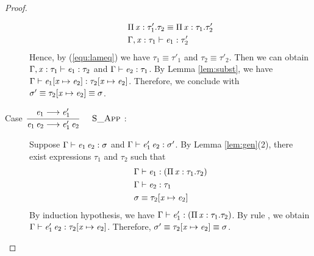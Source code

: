 \begin{proof}
\begin{description}
        \begin{align}
            &\Pi \, \mathit{x}  :  \tau'_{{\mathrm{1}}}  .  \tau_{{\mathrm{2}}}  \equiv  \Pi \, \mathit{x}  :  \tau_{{\mathrm{1}}}  .  \tau'_{{\mathrm{2}}} \label{equ:lameq}\\
            &\Gamma  ,  \mathit{x}  :  \tau_{{\mathrm{1}}}  \vdash  \mathit{e_{{\mathrm{1}}}}  :  \tau'_{{\mathrm{2}}} \nonumber
        \end{align}
        Hence, by (\ref{equ:lameq}) we have $\tau_{{\mathrm{1}}}  \equiv  \tau'_{{\mathrm{1}}}$ and $\tau_{{\mathrm{2}}}  \equiv  \tau'_{{\mathrm{2}}}$. Then we can obtain $\Gamma  ,  \mathit{x}  :  \tau_{{\mathrm{1}}}  \vdash  \mathit{e_{{\mathrm{1}}}}  :  \tau_{{\mathrm{2}}}$ and $\Gamma  \vdash  \mathit{e_{{\mathrm{2}}}}  :  \tau_{{\mathrm{1}}}$. By Lemma \ref{lem:subst}, we have $\Gamma  \vdash  \mathit{e_{{\mathrm{1}}}}  [  \mathit{x}  \mapsto  \mathit{e_{{\mathrm{2}}}}  ]  :  \tau_{{\mathrm{2}}}  [  \mathit{x}  \mapsto  \mathit{e_{{\mathrm{2}}}}  ]$. Therefore, we conclude with $\sigma'  \equiv  \tau_{{\mathrm{2}}}  [  \mathit{x}  \mapsto  \mathit{e_{{\mathrm{2}}}}  ]  \equiv  \sigma$.
        
        \item[Case ${\displaystyle\frac{\begin{array}{l} {\mathit{e_{{\mathrm{1}}}} \longrightarrow \mathit{e'_{{\mathrm{1}}}}} \end{array}}{ \mathit{e_{{\mathrm{1}}}} \, \mathit{e_{{\mathrm{2}}}} \longrightarrow \mathit{e'_{{\mathrm{1}}}} \, \mathit{e_{{\mathrm{2}}}}}\quad\textsc{ {\textsc{S\_App}}{} }}$:] $\quad$ \\
        Suppose $\Gamma  \vdash  \mathit{e_{{\mathrm{1}}}} \, \mathit{e_{{\mathrm{2}}}}  :  \sigma$ and $\Gamma  \vdash  \mathit{e'_{{\mathrm{1}}}} \, \mathit{e_{{\mathrm{2}}}}  :  \sigma'$. By Lemma \ref{lem:gen}(2), there exist expressions $\tau_{{\mathrm{1}}}$ and $\tau_{{\mathrm{2}}}$ such that 
        \begin{align*}
            &\Gamma  \vdash  \mathit{e_{{\mathrm{1}}}}  :  (  \Pi \, \mathit{x}  :  \tau_{{\mathrm{1}}}  .  \tau_{{\mathrm{2}}}  ) \\
            &\Gamma  \vdash  \mathit{e_{{\mathrm{2}}}}  :  \tau_{{\mathrm{1}}}\\
            &\sigma  \equiv  \tau_{{\mathrm{2}}}  [  \mathit{x}  \mapsto  \mathit{e_{{\mathrm{2}}}}  ]
        \end{align*}
        By induction hypothesis, we have $\Gamma  \vdash  \mathit{e'_{{\mathrm{1}}}}  :  (  \Pi \, \mathit{x}  :  \tau_{{\mathrm{1}}}  .  \tau_{{\mathrm{2}}}  )$. By rule , we obtain $\Gamma  \vdash  \mathit{e'_{{\mathrm{1}}}} \, \mathit{e_{{\mathrm{2}}}}  :  \tau_{{\mathrm{2}}}  [  \mathit{x}  \mapsto  \mathit{e_{{\mathrm{2}}}}  ]$. Therefore, $\sigma'  \equiv  \tau_{{\mathrm{2}}}  [  \mathit{x}  \mapsto  \mathit{e_{{\mathrm{2}}}}  ]  \equiv  \sigma$.
        

\end{description}
\end{proof}
